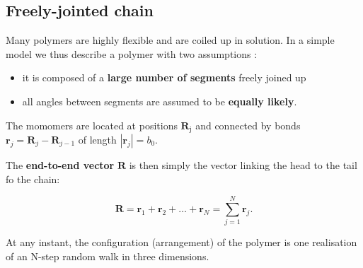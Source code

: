 \documentclass[
  letterpaper,
  enabledeprecatedfontcommands]{report}
\providecommand{\tightlist}{%
  \setlength{\itemsep}{0pt}\setlength{\parskip}{0pt}}
\begin{document}
\subsection{Freely-jointed chain}\label{freely-jointed-chain}

Many polymers are highly flexible and are coiled up in solution. In a
simple model we thus describe a polymer with two assumptions :

\begin{itemize}
\tightlist
\item
  it is composed of a \textbf{large number of segments} freely joined up
\item
  all angles between segments are assumed to be \textbf{equally likely}.
\end{itemize}

The momomers are located at positions \(\mathbf{R}_{\mathrm{j}}\) and
connected by bonds \(\mathbf{r}_{j}=\mathbf{R}_{j}-\mathbf{R}_{j-1}\) of
length \(\left|\mathbf{r}_{j}\right|=b_{0}\).

The \textbf{end-to-end vector} \(\mathbf{R}\) is then simply the vector
linking the head to the tail fo the chain:

\[\mathbf{R} = \mathbf{r}_1+\mathbf{r}_2+\dots+\mathbf{r}_N = \sum_{j=1}^N \mathbf{r}_j.\]

At any instant, the configuration (arrangement) of the polymer is one
realisation of an N-step random walk in three dimensions.
\end{document}
